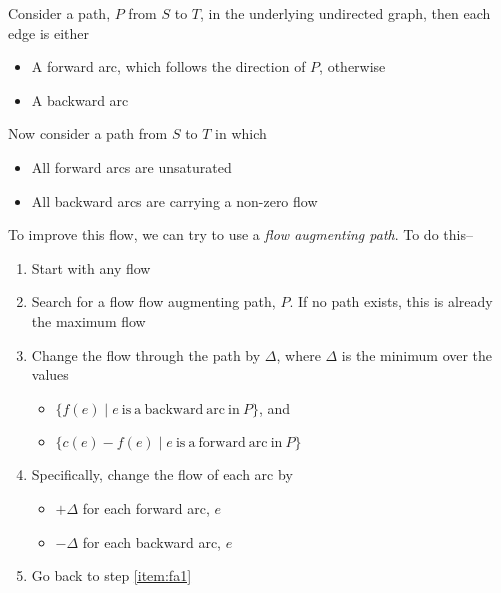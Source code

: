 Consider a path, $P$ from $S$ to $T$, in the underlying undirected graph, then each edge is either
\begin{itemize}
  \item A forward arc, which follows the direction of $P$, otherwise
  \item A backward arc
\end{itemize}
Now consider a path from $S$ to $T$ in which
\begin{itemize}
  \item All forward arcs are unsaturated
  \item All backward arcs are carrying a non-zero flow
\end{itemize}

To improve this flow, we can try to use a \textit{flow augmenting path}. To do this--
\begin{enumerate}
  \item Start with any flow
  \item\label{item:fa1} Search for a flow flow augmenting path, $P$. If no path exists, this is already the maximum flow
  \item Change the flow through the path by $\Delta$, where $\Delta$ is the minimum over the values
  \begin{itemize}
    \item $\{f(e) \mid e \mathrm{\ is\ a\ backward\ arc\ in\ } P\}$, and
    \item $\{c(e) - f(e) \mid e \mathrm{\ is\ a\ forward\ arc\ in\ } P\}$
  \end{itemize}
  \item Specifically, change the flow of each arc by
  \begin{itemize}
    \item $+\Delta$ for each forward arc, $e$
    \item $-\Delta$ for each backward arc, $e$
  \end{itemize}
  \item Go back to step \ref*{item:fa1}
\end{enumerate}

